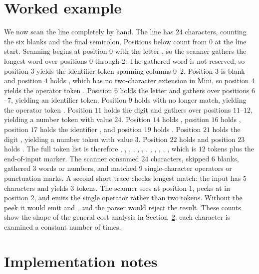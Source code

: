 \section{Worked example}
\label{sec:ch03-worked-example}

We now scan the line  completely by hand.
The line has $24$ characters, counting the six blanks and the final semicolon.
Positions below count from $0$ at the line start.
Scanning begins at position $0$ with the letter , so the scanner gathers the longest word  over positions $0$ through $2$.
The gathered word is not reserved, so position $3$ yields the identifier token  spanning columns $0$--$2$.
Position $3$ is blank and position $4$ holds \code{=}, which has no two-character extension in Mini, so position $4$ yields the operator token \code{=}.
Position $6$ holds the letter  and gathers  over positions $6$--$7$, yielding an identifier token.
Position $9$ holds \code{+} with no longer match, yielding the operator token \code{+}.
Position $11$ holds the digit  and gathers  over positions $11$--$12$, yielding a number token with value $24$.
Position $14$ holds \code{*}, position $16$ holds \code{(}, position $17$ holds the identifier , and position $19$ holds \code{-}.
Position $21$ holds the digit , yielding a number token with value $3$.
Position $22$ holds \code{)} and position $23$ holds \code{;}.
The full token list is therefore , \code{=}, , \code{+}, , \code{*}, \code{(}, , \code{-}, , \code{)}, \code{;}, which is $12$ tokens plus the end-of-input marker.
The scanner consumed $24$ characters, skipped $6$ blanks, gathered $3$ words or numbers, and matched $9$ single-character operators or punctuation marks.
A second short trace checks longest match: the input  has $5$ characters and yields $3$ tokens.
The scanner sees \code{<} at position $1$, peeks at \code{=} in position $2$, and emits the single operator \code{<=} rather than two tokens.
Without the peek it would emit \code{<} and \code{=}, and the parser would reject the result.
These counts show the shape of the general cost analysis in Section~\ref{sec:ch03-implementation}: each character is examined a constant number of times.

\section{Implementation notes}
\label{sec:ch03-implementation}

